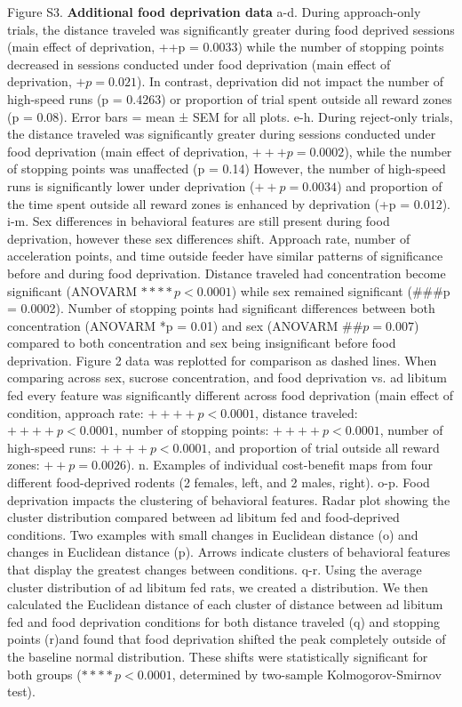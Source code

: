 \documentclass{article}
\begin{document}
\begin{singlespace}
    \noindent Figure S3. \textbf{Additional food deprivation data} a-d. During approach-only trials, the distance traveled was significantly greater during food deprived sessions (main effect of deprivation, ++p = 0.0033) while the number of stopping points
decreased in sessions conducted under food deprivation (main effect of deprivation, $+p = 0.021$).
In contrast, deprivation did not impact the number of high-speed runs (p = 0.4263) or proportion
of trial spent outside all reward zones (p = 0.08). Error bars = mean ± SEM for all plots.
e-h. During reject-only trials, the distance traveled was significantly greater during sessions
conducted under food deprivation (main effect of deprivation, $+++p = 0.0002$), while the number
of stopping points was unaffected (p = 0.14) However, the number of high-speed runs is
significantly lower under deprivation ($++p = 0.0034$) and proportion of the time spent outside all
reward zones is enhanced by deprivation (+p = 0.012).
i-m. Sex differences in behavioral features are still present during food deprivation, however these
sex differences shift. Approach rate, number of acceleration points, and time outside feeder have
similar patterns of significance before and during food deprivation. Distance traveled had
concentration become significant (ANOVARM $****p < 0.0001$) while sex remained significant (\#\#\#p
= 0.0002). Number of stopping points had significant differences between both concentration
(ANOVARM *p = 0.01) and sex (ANOVARM $\#\#p = 0.007$) compared to both concentration and sex
being insignificant before food deprivation. Figure 2 data was replotted for comparison as dashed
lines. When comparing across sex, sucrose concentration, and food deprivation vs. ad libitum fed
every feature was significantly different across food deprivation (main effect of condition,
approach rate: $++++p < 0.0001$, distance traveled: $++++p < 0.0001$, number of stopping points:
$++++p < 0.0001$, number of high-speed runs: $++++p < 0.0001$, and proportion of trial outside all
reward zones: $++p = 0.0026$).
n. Examples of individual cost-benefit maps from four different food-deprived rodents (2 females,
left, and 2 males, right).
o-p. Food deprivation impacts the clustering of behavioral features. Radar plot showing the cluster
distribution compared between ad libitum fed and food-deprived conditions. Two examples with
small changes in Euclidean distance (o) and changes in Euclidean distance (p). Arrows indicate
clusters of behavioral features that display the greatest changes between conditions.
q-r. Using the average cluster distribution of ad libitum fed rats, we created a distribution. We then
calculated the Euclidean distance of each cluster of distance between ad libitum fed and food
deprivation conditions for both distance traveled (q) and stopping points (r)and found that food
deprivation shifted the peak completely outside of the baseline normal distribution. These shifts
were statistically significant for both groups ($****p < 0.0001$, determined by two-sample
Kolmogorov-Smirnov test).
\end{singlespace}
\end{document}
